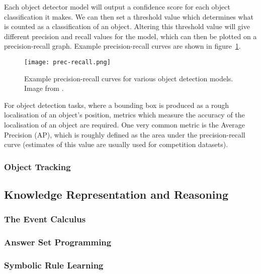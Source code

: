 \documentclass[../interim.tex]{subfiles}
\begin{document}

Each object detector model will output a confidence score for each object classification it makes. We can then set a threshold value which determines what is counted as a classification of an object. Altering this threshold value will give different precision and recall values for the model, which can then be plotted on a precision-recall graph. Example precision-recall curves are shown in figure~\ref{fig:prec-recall}.

\begin{figure}
  \centering
  \texttt{[image: prec-recall.png]}
  \caption{Example precision-recall curves for various object detection models. Image from \cite{yolo}.}
  \label{fig:prec-recall}
\end{figure}

For object detection tasks, where a bounding box is produced as a rough localisation of an object's position, metrics which measure the accuracy of the localisation of an object are required. One very common metric is the Average Precision (AP), which is roughly defined as the area under the precision-recall curve (estimates of this value are usually used for competition datasets).


\subsubsection{Object Tracking}


\subsection{Knowledge Representation and Reasoning}

\subsubsection{The Event Calculus}

\subsubsection{Answer Set Programming}

\subsubsection{Symbolic Rule Learning}
\end{document}

